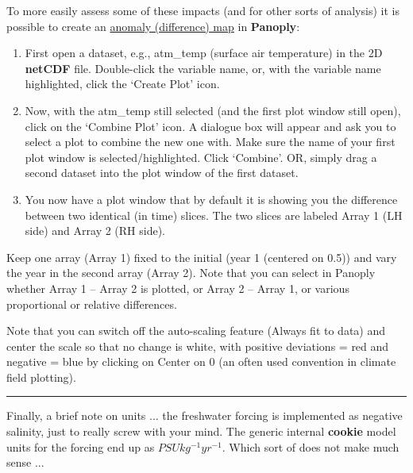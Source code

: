 \noindent To more easily assess some of these impacts (and for other sorts of analysis) it is possible to create an \uline{anomaly (difference) map} in \textbf{Panoply}:

\vspace{1mm}
\begin{enumerate}[noitemsep]
\vspace{1mm}
\item  First open a dataset, e.g., \textsf{\footnotesize atm\_temp} (surface air temperature) in the 2D \textbf{netCDF} file. Double-click the variable name, or, with the variable name highlighted, click the ‘Create Plot’ icon.
\vspace{-3mm}
\item Now, with the \textsf{\footnotesize atm\_temp} still selected (and the first plot window still open), click on the ‘Combine Plot’ icon. A dialogue box will appear and ask you to select a plot to combine the new one with. Make sure the name of your first plot window is selected/highlighted. Click ‘Combine’. OR, simply drag a second dataset into the plot window of the first dataset.
\vspace{1mm}
\item You now have a plot window that by default it is showing you the difference between two identical (in time) slices. The two slices are labeled Array 1 (LH side) and Array 2 (RH side).
\end{enumerate}
\vspace{1mm}

Keep one array (Array 1) fixed to the initial (year 1 (centered on 0.5)) and vary the year in the second array (Array 2). Note that you can select in Panoply whether Array 1 – Array 2 is plotted, or Array 2 – Array 1, or various proportional or relative differences.

Note that you can switch off the auto-scaling feature (Always fit to data) and center the scale so that no change is white, with positive deviations = red and negative = blue by clicking on Center on 0 (an often used convention in climate field plotting).

\vspace{1mm}\noindent\rule{4cm}{0.5pt}\vspace{2mm}

\noindent Finally, a brief note on units ... the freshwater forcing is implemented as negative salinity, just to really screw with your mind. The generic internal \textbf{cookie} model units for the forcing end up as \(PSU kg^{-1} yr^{-1}\). Which sort of does not make much sense ...

